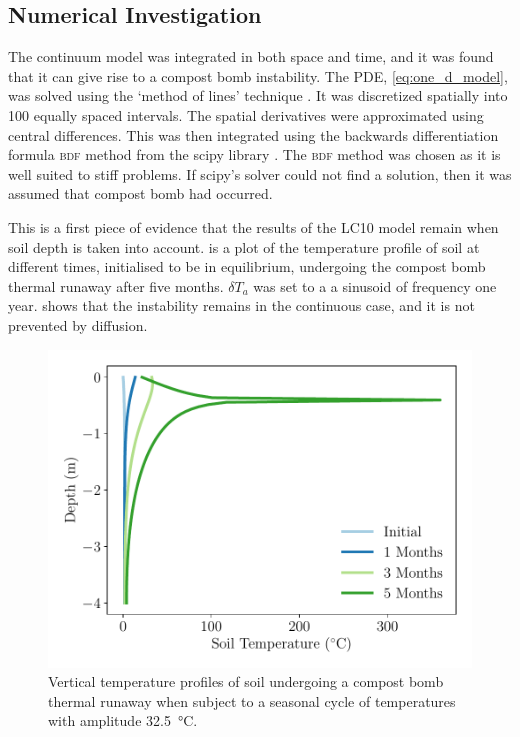 \subsection{Numerical Investigation}
\label{sec:numerical_investigation}
The continuum model was integrated in both space and time, and it was found that it can give rise to a compost bomb instability.
The PDE, \cref{eq:one_d_model}, was solved using the `method of lines' technique \parencite{Schiesser2012}. It was discretized spatially into 100 equally spaced intervals.
The spatial derivatives were approximated using central differences. This was then integrated using
the backwards differentiation formula \textsc{bdf} method from the scipy library \parencite{Virtanen2020}. The \textsc{bdf} method was chosen as it is well suited to stiff problems.
If scipy's solver could not find a solution, then it was assumed that compost bomb had occurred.

This is a first piece of evidence that the results of the LC10 model remain when soil depth is taken into account. 
is a plot of the temperature profile of soil at different times, initialised to be in equilibrium, undergoing the compost bomb thermal runaway after five months.
$\delta T_a$ was set to a  a sinusoid of frequency one year.  shows that
the instability remains in the continuous case, and it is not prevented by diffusion.

\begin{figure}
  \centering
  \includegraphics[width=\textwidth,keepaspectratio]{seasonal_cycle_profiles}
  \caption[Vertical profile of soil temperature]{Vertical temperature profiles of soil undergoing a compost bomb thermal runaway when subject to a seasonal cycle of
    temperatures with amplitude \SI{32.5}{\degreeCelsius}.}
  \label{fig:vertical_profiles}
\end{figure}
